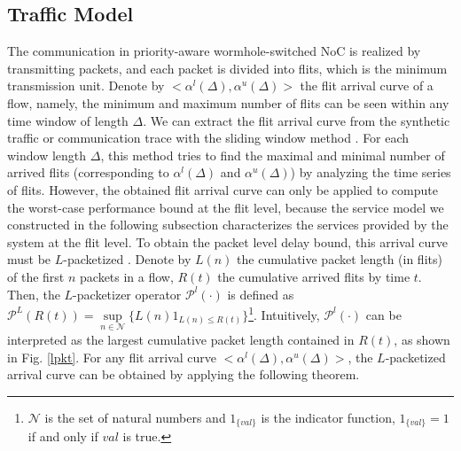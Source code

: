 \documentclass[preprint]{elsarticle}
\begin{document}
\subsection{Traffic Model}\label{traffic}
The communication in priority-aware wormhole-switched NoC is realized by transmitting packets, and each packet is divided into flits, which is the minimum transmission unit. Denote by $<\alpha^l(\Delta),\alpha^u(\Delta)>$ the flit arrival curve of a flow, namely, the minimum and maximum number of flits can be seen within any time window of length $\Delta$. We can extract the flit arrival curve from the synthetic traffic or communication trace with the sliding window method \cite{1253607}. For each window length $\Delta$, this method tries to find the maximal and minimal number of arrived flits (corresponding to $\alpha^l(\Delta)$ and $\alpha^u(\Delta)$) by analyzing the time series of flits. However, the obtained flit arrival curve can only be applied to compute the worst-case performance bound at the flit level, because the service model we constructed in the following subsection characterizes the services provided by the system at the flit level. To obtain the packet level delay bound, this arrival curve must be $L$-packetized \cite{Boudec2001Network}. Denote by $L(n)$ the cumulative packet length (in flits) of the first $n$ packets in a flow, $R(t)$ the cumulative arrived flits by time $t$. Then, the $L$-packetizer operator $\mathcal{P}^l(\cdot)$ is defined as $\mathcal{P}^L(R(t))=\underset{n\in\mathcal{N}}{\sup}\{L(n)1_{L(n)\leq R(t)}\}$\footnote{$\mathcal{N}$ is the set of natural numbers and $1_{\{val\}}$ is the indicator function, $1_{\{val\}}=1$ if and only if $val$ is true.}. Intuitively, $\mathcal{P}^l(\cdot)$ can be interpreted as the largest cumulative packet length contained in $R(t)$, as shown in Fig. \ref{lpkt}. For any flit arrival curve $<\alpha^l(\Delta),\alpha^u(\Delta)>$, the $L$-packetized arrival curve can be obtained by applying the following theorem.
\end{document}

